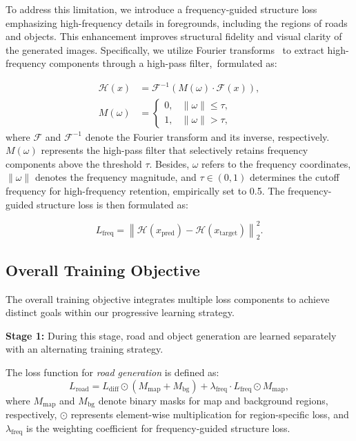 To address this limitation, we introduce a frequency-guided structure loss emphasizing high-frequency details in foregrounds, including the regions of roads and objects. This enhancement improves structural fidelity and visual clarity of the generated images.
Specifically, we utilize Fourier transforms~\cite{brigham1988fast} to extract high-frequency components through a high-pass filter, formulated as:

\begin{equation}
	\begin{aligned}
		\mathcal{H}(x) &= \mathcal{F}^{-1}(M(\omega) \cdot \mathcal{F}(x)), \\
		M(\omega) &= 
		\begin{cases}
			0, & \|\omega\| \le \tau, \\
			1, & \|\omega\| > \tau,
		\end{cases}
	\end{aligned}
\end{equation}
where $\mathcal{F}$ and $\mathcal{F}^{-1}$ denote the Fourier transform and its inverse, respectively. $M(\omega)$ represents the high-pass filter that selectively retains frequency components above the threshold $\tau$. Besides, $\omega$ refers to the frequency coordinates, $\|\omega\|$ denotes the frequency magnitude, and $\tau \in (0,1)$ determines the cutoff frequency for high-frequency retention, empirically set to 0.5.
The frequency-guided structure loss is then formulated as:

\begin{equation}
	L_{\text{freq}} = \left\| \mathcal{H}(x_{\text{pred}}) - \mathcal{H}(x_{\text{target}}) \right\|_2^2.
\end{equation}

\subsection{Overall Training Objective}
The overall training objective integrates multiple loss components to achieve distinct goals within our progressive learning strategy. 

\textbf{Stage 1:} 
During this stage, road and object generation are learned separately with an alternating training strategy.

The loss function for \textit{road generation}  is defined as:
\begin{equation}
	L_{\text{road}} = L_{\text{diff}} \odot (M_{\text{map}} + M_{\text{bg}}) + \lambda_{\text{freq}} \cdot L_{\text{freq}} \odot M_{\text{map}},
\end{equation}
where $M_{\text{map}}$ and $M_{\text{bg}}$ denote binary masks for map and background regions, respectively, $\odot$ represents element-wise multiplication for region-specific loss, and $\lambda_{\text{freq}}$ is the weighting coefficient for frequency-guided structure loss.

